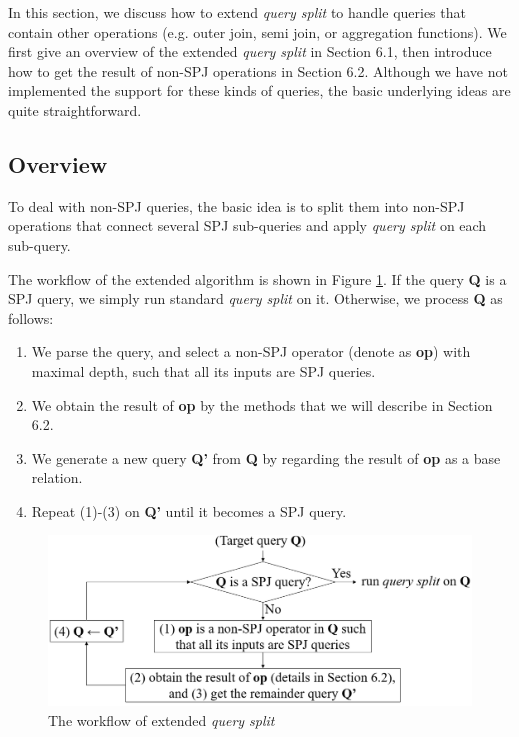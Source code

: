 In this section, we discuss how to extend \textit{query split} to handle queries that contain other operations (e.g. outer join, semi join, or aggregation functions). We first give an overview of the extended \textit{query split} in Section 6.1, then introduce how to get the result of non-SPJ operations in Section 6.2. Although we have not implemented the support for these kinds of queries, the basic underlying ideas are quite straightforward. 
\subsection{Overview} \label{S61}
    To deal with non-SPJ queries, the basic idea is to split them into non-SPJ operations that connect several SPJ sub-queries and apply \textit{query split} on each sub-query.\par
    The workflow of the extended algorithm is shown in Figure \ref{F13}. If the query \textbf{Q} is a SPJ query, we simply run standard \textit{query split} on it. Otherwise, we process \textbf{Q} as follows:
    \begin{enumerate}[leftmargin = 15pt]
        \item We parse the query, and select a non-SPJ operator (denote as \textbf{op}) with maximal depth, such that all its inputs are SPJ queries.
        \item We obtain the result of \textbf{op} by the methods that we will describe in Section 6.2. 
        \item We generate a new query \textbf{Q'} from \textbf{Q} by regarding the result of \textbf{op} as a base relation.
        \item Repeat (1)-(3) on \textbf{Q'} until it becomes a SPJ query.
    \end{enumerate}
    \begin{figure}[htb]
        \centering
        \includegraphics[width=\linewidth]{./pic/Figure13.png}
        \caption{The workflow of extended \textit{query split}}
        \label{F13}
        \Description{}
    \end{figure}

